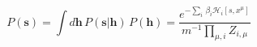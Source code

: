 \documentclass{article}
\begin{document}
%
\begin{equation} \label{eq:ps3}
P(\mathbf{s}) = \int d \mathbf{h} \, P(\mathbf{s} | \mathbf{h}) \, P(\mathbf{h}) =  \frac{e^{-\sum_i \, \beta_i \mathscr{H}_i[s, x^{\mu}]}}{m^{-1}\prod_{\mu,i} Z_{i, \mu}}   %
\end{equation}
\end{document}
